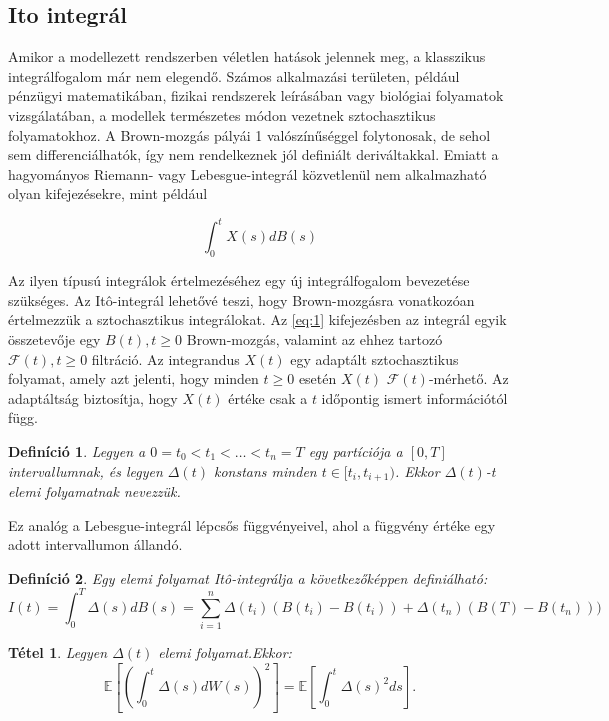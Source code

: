 \documentclass[12pt, a4paper]{article}
\newtheorem{definition}{Definíció}[subsection]
\newtheorem{theorem}{Tétel}[subsection]
\begin{document}
\subsection{Ito integrál}

Amikor a modellezett rendszerben véletlen hatások jelennek meg, a klasszikus integrálfogalom már nem elegendő. Számos alkalmazási területen, például pénzügyi matematikában, fizikai rendszerek leírásában vagy biológiai folyamatok vizsgálatában, a modellek természetes módon vezetnek sztochasztikus folyamatokhoz. A Brown-mozgás pályái 1 valószínűséggel folytonosak, de sehol sem differenciálhatók, így nem rendelkeznek jól definiált deriváltakkal. Emiatt a hagyományos Riemann- vagy Lebesgue-integrál közvetlenül nem alkalmazható olyan kifejezésekre, mint például

\begin{equation}\label{eq:1}
\int_0^t X(s) dB(s)
\end{equation}

Az ilyen típusú integrálok értelmezéséhez egy új integrálfogalom bevezetése szükséges. Az Itô-integrál lehetővé teszi, hogy Brown-mozgásra vonatkozóan értelmezzük a sztochasztikus integrálokat. Az \ref{eq:1} kifejezésben az integrál egyik összetevője egy $B(t), t\ge0$ Brown-mozgás, valamint az ehhez tartozó $\mathcal{F}(t), t\ge0$ filtráció. Az integrandus $X(t)$ egy adaptált sztochasztikus folyamat, amely azt jelenti, hogy minden $t\ge0$ esetén $X(t)$ $\mathcal{F}(t)$-mérhető. Az adaptáltság biztosítja, hogy $X(t)$ értéke csak a $t$ időpontig ismert információtól függ.

\begin{definition}\label{def_tizenharmadik}
\cite{shreve2004} Legyen a $0 = t_0 < t_1 < \dots < t_n = T$ egy partíciója a $[0, T]$ intervallumnak, és legyen $\Delta(t)$ konstans minden $t \in [t_i, t_{i+1})$. Ekkor $\Delta(t)$-t elemi folyamatnak nevezzük.
\end{definition}

Ez analóg a Lebesgue-integrál lépcsős függvényeivel, ahol a függvény értéke egy adott intervallumon állandó.

\begin{definition}\label{def_tizennegyedik}
\cite{shreve2004} Egy elemi folyamat Itô-integrálja a következőképpen definiálható:
\[
I(t) = \int_0^T \Delta(s) dB(s) = \sum_{i=1}^{n} \Delta(t_i) (B(t_{i}) - B(t_i)) + \Delta(t_n) (B(T) - B(t_n)))
\]
\end{definition}

\begin{theorem}\label{thm_ito_isometry}
\cite{shreve2004} Legyen $\Delta(t)$ elemi folyamat.Ekkor:
\[
\mathbb{E}\left[
\left(
\int_0^t \Delta(s)dW(s)
\right)^2
\right]
=
\mathbb{E}\left[
\int_0^t \Delta(s)^2 ds
\right].
\]
\end{theorem}
\end{document}
